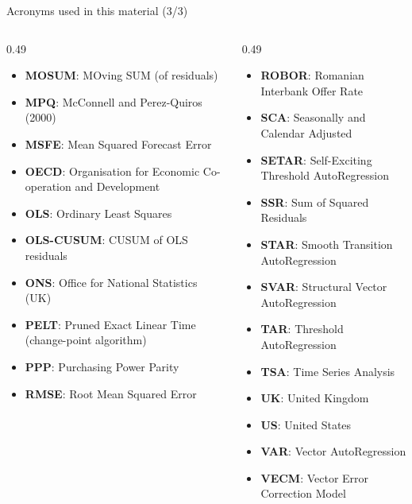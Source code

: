\begin{frame}{Acronyms used in this material (3/3)}
\begin{columns}[T]
\begin{column}{0.49\textwidth}
\begin{itemize}\setlength{\itemsep}{0pt}
    \item \textbf{MOSUM}: MOving SUM (of residuals)
    \item \textbf{MPQ}: McConnell and Perez-Quiros (2000)
    \item \textbf{MSFE}: Mean Squared Forecast Error
    \item \textbf{OECD}: Organisation for Economic Co-operation and Development
    \item \textbf{OLS}: Ordinary Least Squares
    \item \textbf{OLS-CUSUM}: CUSUM of OLS residuals
    \item \textbf{ONS}: Office for National Statistics (UK)
    \item \textbf{PELT}: Pruned Exact Linear Time (change-point algorithm)
    \item \textbf{PPP}: Purchasing Power Parity
    \item \textbf{RMSE}: Root Mean Squared Error
\end{itemize}
\end{column}
\begin{column}{0.49\textwidth}
\begin{itemize}\setlength{\itemsep}{0pt}
    \item \textbf{ROBOR}: Romanian Interbank Offer Rate
    \item \textbf{SCA}: Seasonally and Calendar Adjusted
    \item \textbf{SETAR}: Self-Exciting Threshold AutoRegression
    \item \textbf{SSR}: Sum of Squared Residuals
    \item \textbf{STAR}: Smooth Transition AutoRegression
    \item \textbf{SVAR}: Structural Vector AutoRegression
    \item \textbf{TAR}: Threshold AutoRegression
    \item \textbf{TSA}: Time Series Analysis
    \item \textbf{UK}: United Kingdom
    \item \textbf{US}: United States
    \item \textbf{VAR}: Vector AutoRegression
    \item \textbf{VECM}: Vector Error Correction Model
\end{itemize}
\end{column}
\end{columns}
\end{frame}


